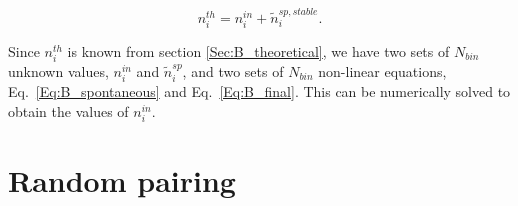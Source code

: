 \begin{equation}
\label{Eq:B_final}
n_i^{th} = n_i^{in} + \tilde{n}_{i}^{sp,stable} .
\end{equation}

Since $n_i^{th}$ is known from section \ref{Sec:B_theoretical}, we have two sets of $N_{bin}$ unknown values, $n_i^{in}$ and $\tilde{n}_i^{sp}$, and two sets of $N_{bin}$ non-linear equations, Eq.~\ref{Eq:B_spontaneous} and Eq.~\ref{Eq:B_final}. This can be numerically solved to obtain the values of $n_i^{in}$.

\section{Random pairing}




